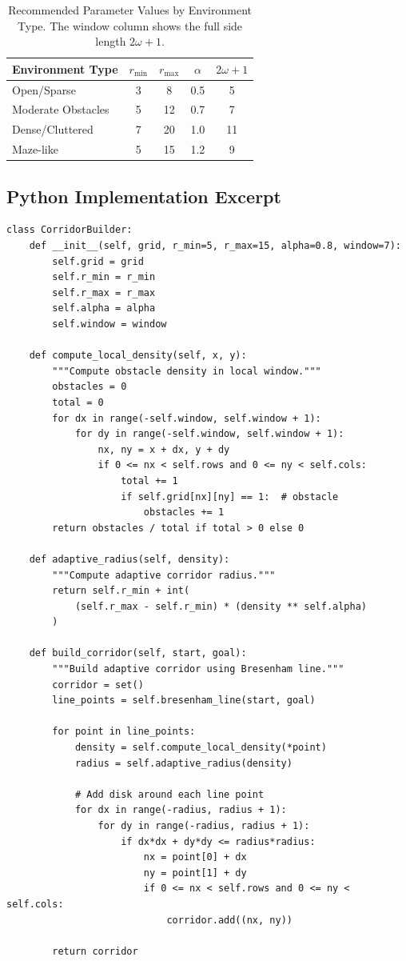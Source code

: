 \documentclass[11pt]{article}
\begin{document}
\begin{table}[H]
\centering
\caption{Recommended Parameter Values by Environment Type. The window column shows the full side length $2\omega{+}1$.}
\label{tab:parameters}
\begin{tabular}{@{}lcccc@{}}
\toprule
Environment Type & $r_{\min}$ & $r_{\max}$ & $\alpha$ & $2\omega{+}1$ \\
\midrule
Open/Sparse & 3 & 8 & 0.5 & 5 \\
Moderate Obstacles & 5 & 12 & 0.7 & 7 \\
Dense/Cluttered & 7 & 20 & 1.0 & 11 \\
Maze-like & 5 & 15 & 1.2 & 9 \\
\bottomrule
\end{tabular}
\end{table}

\subsection{Python Implementation Excerpt}

\begin{lstlisting}[caption={Core AILS Corridor Builder}]
class CorridorBuilder:
    def __init__(self, grid, r_min=5, r_max=15, alpha=0.8, window=7):
        self.grid = grid
        self.r_min = r_min
        self.r_max = r_max
        self.alpha = alpha
        self.window = window

    def compute_local_density(self, x, y):
        """Compute obstacle density in local window."""
        obstacles = 0
        total = 0
        for dx in range(-self.window, self.window + 1):
            for dy in range(-self.window, self.window + 1):
                nx, ny = x + dx, y + dy
                if 0 <= nx < self.rows and 0 <= ny < self.cols:
                    total += 1
                    if self.grid[nx][ny] == 1:  # obstacle
                        obstacles += 1
        return obstacles / total if total > 0 else 0

    def adaptive_radius(self, density):
        """Compute adaptive corridor radius."""
        return self.r_min + int(
            (self.r_max - self.r_min) * (density ** self.alpha)
        )

    def build_corridor(self, start, goal):
        """Build adaptive corridor using Bresenham line."""
        corridor = set()
        line_points = self.bresenham_line(start, goal)

        for point in line_points:
            density = self.compute_local_density(*point)
            radius = self.adaptive_radius(density)

            # Add disk around each line point
            for dx in range(-radius, radius + 1):
                for dy in range(-radius, radius + 1):
                    if dx*dx + dy*dy <= radius*radius:
                        nx = point[0] + dx
                        ny = point[1] + dy
                        if 0 <= nx < self.rows and 0 <= ny < self.cols:
                            corridor.add((nx, ny))

        return corridor
\end{lstlisting}
\end{document}
